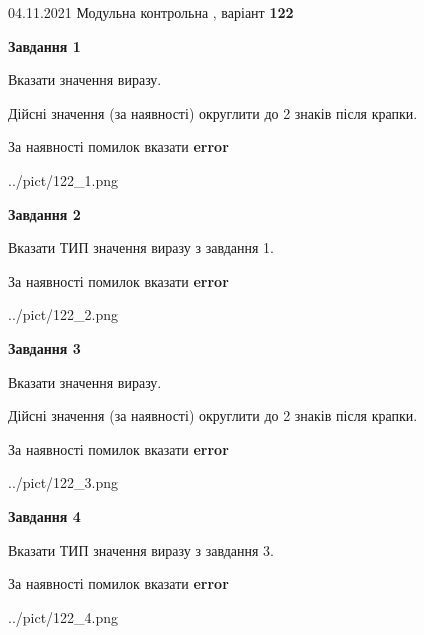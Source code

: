 \documentclass[11pt, ukrainian]{article}
\begin{document}
{04.11.2021 Модульна контрольна , варіант  \No \textbf { 122 }\par}
{
\begin {large}
{\begin {center}\textbf{Завдання 1}\end {center}}\par
Вказати значення виразу. \par
Дійсні значення (за наявності) округлити до 2 знаків після крапки. \par
За наявності помилок вказати \textbf{error}

\begin{center}
	{../pict/122_1.png}
\end{center}
\newpage

{\begin {center}\textbf{Завдання 2}\end {center}}\par
Вказати ТИП значення виразу з завдання 1. \par
За наявності помилок вказати \textbf{error}

\begin{center}
	{../pict/122_2.png}
\end{center}
\newpage

{\begin {center}\textbf{Завдання 3}\end {center}}\par
Вказати значення виразу. \par
Дійсні значення (за наявності) округлити до 2 знаків після крапки. \par
За наявності помилок вказати \textbf{error}

\begin{center}
	{../pict/122_3.png}
\end{center}
\newpage

{\begin {center}\textbf{Завдання 4}\end {center}}\par
Вказати ТИП значення виразу з завдання 3. \par
За наявності помилок вказати \textbf{error}

\begin{center}
	{../pict/122_4.png}
\end{center}
\newpage


\end{large}}
\end{document}
